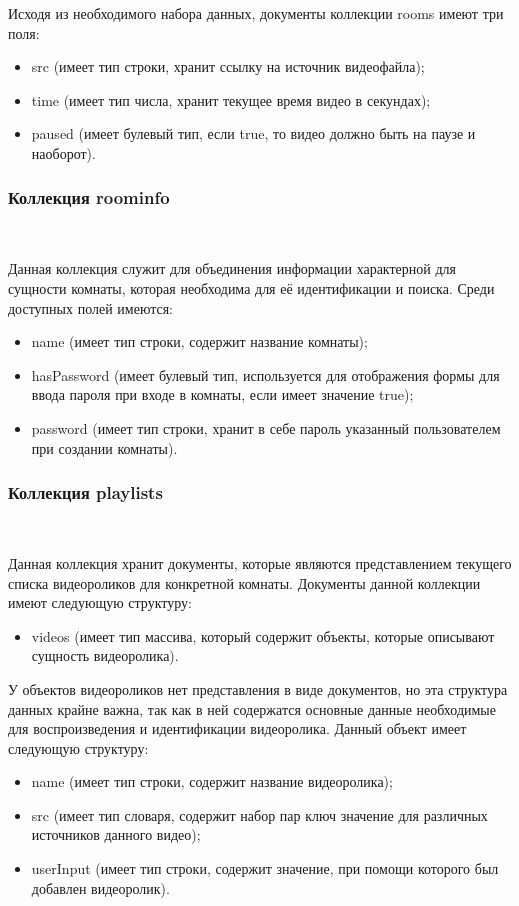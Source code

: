 Исходя из необходимого набора данных, документы коллекции rooms имеют три поля:
\begin{itemize}
 \item src (имеет тип строки, хранит ссылку на источник видеофайла);
 \item time (имеет тип числа, хранит текущее время видео в секундах);
 \item paused (имеет булевый тип, если true, то видео должно быть на паузе и наоборот).
\end{itemize}
 
\subsubsection{Коллекция roominfo}~\par
Данная коллекция служит для объединения информации характерной для сущности комнаты, которая необходима для её идентификации и поиска. Среди доступных полей имеются:
\begin{itemize}
 \item name (имеет тип строки, содержит название комнаты);
 \item hasPassword (имеет булевый тип, используется для отображения формы для ввода пароля при входе в комнаты, если имеет значение true);
 \item password (имеет тип строки, хранит в себе пароль указанный пользователем при создании комнаты).
\end{itemize}
 
\subsubsection{Коллекция playlists}~\par
\label{arch:data:playlist}
Данная коллекция хранит документы, которые являются представлением текущего списка видеороликов для конкретной комнаты. Документы данной коллекции имеют следующую структуру:
\begin{itemize}
 \item videos (имеет тип массива, который содержит объекты, которые описывают сущность видеоролика).
\end{itemize}
 
У объектов видеороликов нет представления в виде документов, но эта структура данных крайне важна, так как в ней содержатся основные данные необходимые для воспроизведения и идентификации видеоролика. Данный объект имеет следующую структуру:
\begin{itemize}
 \item name (имеет тип строки, содержит название видеоролика);
 \item src (имеет тип словаря, содержит набор пар ключ значение для различных источников данного видео);
 \item userInput (имеет тип строки, содержит значение, при помощи которого был добавлен видеоролик).
\end{itemize}
 
